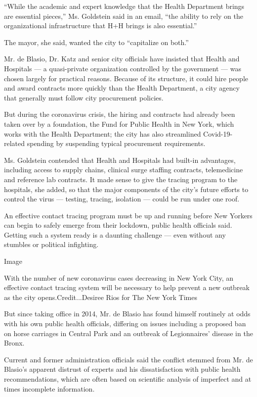 ``While the academic and expert knowledge that the Health Department
brings are essential pieces,'' Ms. Goldstein said in an email, ``the
ability to rely on the organizational infrastructure that H+H brings is
also essential.''

The mayor, she said, wanted the city to ``capitalize on both.''

Mr. de Blasio, Dr. Katz and senior city officials have insisted that
Health and Hospitals --- a quasi-private organization controlled by the
government --- was chosen largely for practical reasons. Because of its
structure, it could hire people and award contracts more quickly than
the Health Department, a city agency that generally must follow city
procurement policies.

But during the coronavirus crisis, the hiring and contracts had already
been taken over by a foundation, the Fund for Public Health in New York,
which works with the Health Department; the city has also streamlined
Covid-19-related spending by suspending typical procurement
requirements.

Ms. Goldstein contended that Health and Hospitals had built-in
advantages, including access to supply chains, clinical surge staffing
contracts, telemedicine and reference lab contracts. It made sense to
give the tracing program to the hospitals, she added, so that the major
components of the city's future efforts to control the virus ---
testing, tracing, isolation --- could be run under one roof.

An effective contact tracing program must be up and running before New
Yorkers can begin to safely emerge from their lockdown, public health
officials said. Getting such a system ready is a daunting challenge ---
even without any stumbles or political infighting.

Image

With the number of new coronavirus cases decreasing in New York City, an
effective contact tracing system will be necessary to help prevent a new
outbreak as the city opens.Credit...Desiree Rios for The New York Times

But since taking office in 2014, Mr. de Blasio has found himself
routinely at odds with his own public health officials, differing on
issues including a proposed ban on horse carriages in Central Park and
an outbreak of Legionnaires' disease in the Bronx.

Current and former administration officials said the conflict stemmed
from Mr. de Blasio's apparent distrust of experts and his
dissatisfaction with public health recommendations, which are often
based on scientific analysis of imperfect and at times incomplete
information.

